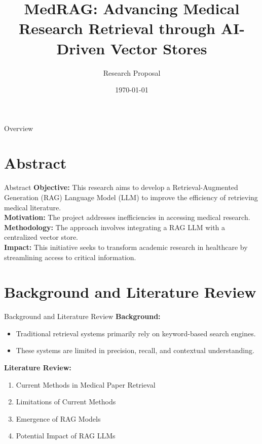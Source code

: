 \documentclass{beamer}
\title{MedRAG: Advancing Medical Research Retrieval through AI-Driven Vector Stores}
\author{Research Proposal}
\date{\today}
\begin{document}
\begin{frame}
  \titlepage
\end{frame}

\begin{frame}{Overview}
  \tableofcontents
\end{frame}

\section{Abstract}
\begin{frame}{Abstract}
  \textbf{Objective:} This research aims to develop a Retrieval-Augmented Generation (RAG) Language Model (LLM) to improve the efficiency of retrieving medical literature.\\
  \textbf{Motivation:} The project addresses inefficiencies in accessing medical research.\\
  \textbf{Methodology:} The approach involves integrating a RAG LLM with a centralized vector store.\\
  \textbf{Impact:} This initiative seeks to transform academic research in healthcare by streamlining access to critical information.
\end{frame}

\section{Background and Literature Review}
\begin{frame}{Background and Literature Review}
  \textbf{Background:}
  \begin{itemize}
    \item Traditional retrieval systems primarily rely on keyword-based search engines.
    \item These systems are limited in precision, recall, and contextual understanding.
  \end{itemize}
  \textbf{Literature Review:}
  \begin{enumerate}
    \item Current Methods in Medical Paper Retrieval
    \item Limitations of Current Methods
    \item Emergence of RAG Models
    \item Potential Impact of RAG LLMs
  \end{enumerate}
\end{frame}
\end{document}
